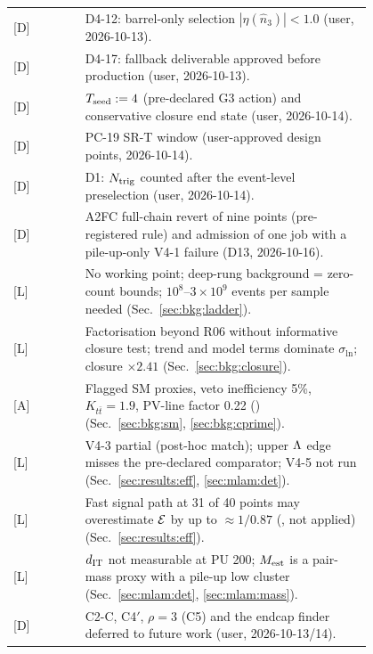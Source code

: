 \begin{center}
\begin{longtable}{lp{0.80\linewidth}}
{[D]} & D4-12: barrel-only selection $|\eta(\hat n_3)|<1.0$ (user, 2026-10-13).\\
{[D]} & D4-17: fallback deliverable approved before production (user, 2026-10-13).\\
{[D]} & $T_{\rm seed}:=4$ (pre-declared G3 action) and conservative closure end state (user, 2026-10-14).\\
{[D]} & PC-19 SR-T window (user-approved design points, 2026-10-14).\\
{[D]} & D1: $N_{\rm trig}$ counted after the event-level preselection (user, 2026-10-14).\\
{[D]} & A2FC full-chain revert of nine points (pre-registered rule) and admission of one job with a pile-up-only V4-1
      failure (D13, 2026-10-16).\\
{[L]} & No working point; deep-rung background = zero-count bounds; $10^8$--$3\times10^9$ events per sample needed (Sec.~\ref{sec:bkg:ladder}).\\
{[L]} & Factorisation beyond R06 without informative closure test; trend and model terms dominate $\sigma_{\ln}$; closure $\times2.41$ (Sec.~\ref{sec:bkg:closure}).\\
{[A]} & Flagged SM proxies, veto inefficiency 5\%, $K_{t\bar t}=1.9$, PV-line factor 0.22 (\EST{}) (Sec.~\ref{sec:bkg:sm}, \ref{sec:bkg:cprime}).\\
{[L]} & V4-3 partial (post-hoc match); upper $\Lambda$ edge misses the pre-declared comparator; V4-5 not run (Sec.~\ref{sec:results:eff}, \ref{sec:mlam:det}).\\
{[L]} & Fast signal path at 31 of 40 points may overestimate $\mathcal{E}$ by up to $\approx1/0.87$ (\EST{}, not applied) (Sec.~\ref{sec:results:eff}).\\
{[L]} & $d_{\rm IT}$ not measurable at PU 200; $M_{\rm est}$ is a pair-mass proxy with a pile-up low cluster (Sec.~\ref{sec:mlam:det}, \ref{sec:mlam:mass}).\\
{[D]} & C2-C, C4$'$, $\rho=3$ (C5) and the endcap finder deferred to future work (user, 2026-10-13/14).\\
\bottomrule
\end{longtable}
\end{center}

